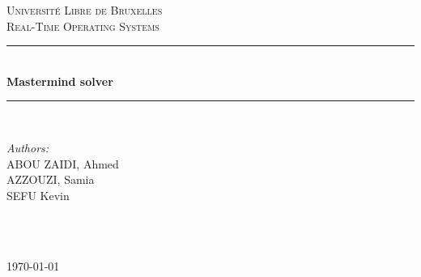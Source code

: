 \begin{titlepage}

\newcommand{\HRule}{\rule{\linewidth}{0.5mm}} %

\center %
 

\textsc{\LARGE Université Libre de Bruxelles}\\[1.5cm] %
\textsc{\Large Real-Time Operating Systems }\\[0.5cm] %


\HRule \\[0.4cm]
{ \huge \bfseries Mastermind solver}\\[0.4cm] %
\HRule \\[1.5cm]
 

\begin{minipage}{0.4\textwidth}
\begin{flushleft} \large
\emph{Authors:}\\
ABOU ZAIDI, Ahmed \\
AZZOUZI, Samia \\
SEFU  Kevin %
\end{flushleft}
\end{minipage}
~
\begin{minipage}{0.4\textwidth}
\begin{flushright} \large

\end{flushright}
\end{minipage}\\[2cm]



{\large \today}\\[2cm] %


\vfill %

\end{titlepage}


